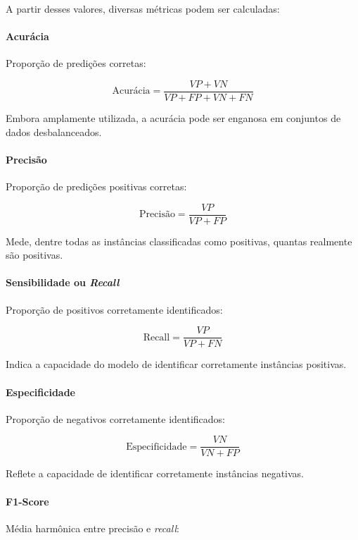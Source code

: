 \documentclass[12pt]{article}
\begin{document}
A partir desses valores, diversas métricas podem ser calculadas:

\paragraph{Acurácia} Proporção de predições corretas:

\begin{equation}
\text{Acurácia} = \frac{VP + VN}{VP + FP + VN + FN}
\end{equation}

Embora amplamente utilizada, a acurácia pode ser enganosa em conjuntos de dados desbalanceados.

\paragraph{Precisão} Proporção de predições positivas corretas:

\begin{equation}
\text{Precisão} = \frac{VP}{VP + FP}
\end{equation}

Mede, dentre todas as instâncias classificadas como positivas, quantas realmente são positivas.

\paragraph{Sensibilidade ou \emph{Recall}} Proporção de positivos corretamente identificados:

\begin{equation}
\text{Recall} = \frac{VP}{VP + FN}
\end{equation}

Indica a capacidade do modelo de identificar corretamente instâncias positivas.

\paragraph{Especificidade} Proporção de negativos corretamente identificados:

\begin{equation}
\text{Especificidade} = \frac{VN}{VN + FP}
\end{equation}

Reflete a capacidade de identificar corretamente instâncias negativas.

\paragraph{F1-Score} Média harmônica entre precisão e \emph{recall}:
\end{document}
